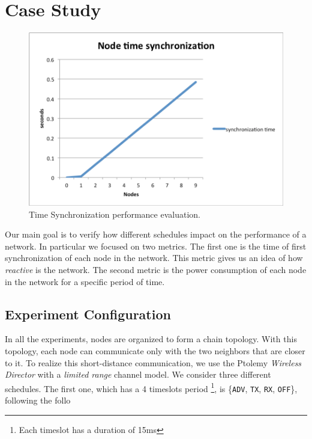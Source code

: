 
\section{Case Study}
\label{sec:case-study}

\begin{figure}[t]
\centering
\includegraphics[width=1\columnwidth]{figures/timesynch}
\caption{Time Synchronization performance evaluation.}
\label{fig:timeCorrection}
\end{figure}

Our main goal is to verify how different schedules impact on the performance of a network. In particular we focused on two metrics. The first one is the time of first synchronization of each node in the network. This metric gives us an idea of how \emph{reactive} is the network. The second metric is the power consumption of each node in the network for a specific period of time. 

\subsection{Experiment Configuration}
\label{sec:exp_config}

In all the experiments, nodes are organized to form a chain topology. With this topology, each node can communicate only with the two neighbors that are closer to it. To realize this short-distance communication, we use the Ptolemy \emph{Wireless Director} with a \emph{limited range} channel model.
We consider three different schedules. The first one, which has a 4 timeslots period \footnote{Each timeslot has a duration of 15ms}, is \{\texttt{ADV}, \texttt{TX}, \texttt{RX}, \texttt{OFF}\}, following the follo


